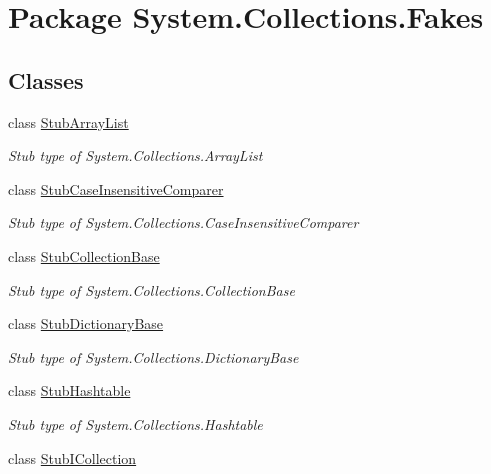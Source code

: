 \hypertarget{namespace_system_1_1_collections_1_1_fakes}{\section{Package System.\-Collections.\-Fakes}
\label{namespace_system_1_1_collections_1_1_fakes}
}
\subsection*{Classes}
\begin{DoxyCompactItemize}
\item 
class \hyperlink{class_system_1_1_collections_1_1_fakes_1_1_stub_array_list}{Stub\-Array\-List}
\begin{DoxyCompactList}\small\item\em Stub type of System.\-Collections.\-Array\-List\end{DoxyCompactList}\item 
class \hyperlink{class_system_1_1_collections_1_1_fakes_1_1_stub_case_insensitive_comparer}{Stub\-Case\-Insensitive\-Comparer}
\begin{DoxyCompactList}\small\item\em Stub type of System.\-Collections.\-Case\-Insensitive\-Comparer\end{DoxyCompactList}\item 
class \hyperlink{class_system_1_1_collections_1_1_fakes_1_1_stub_collection_base}{Stub\-Collection\-Base}
\begin{DoxyCompactList}\small\item\em Stub type of System.\-Collections.\-Collection\-Base\end{DoxyCompactList}\item 
class \hyperlink{class_system_1_1_collections_1_1_fakes_1_1_stub_dictionary_base}{Stub\-Dictionary\-Base}
\begin{DoxyCompactList}\small\item\em Stub type of System.\-Collections.\-Dictionary\-Base\end{DoxyCompactList}\item 
class \hyperlink{class_system_1_1_collections_1_1_fakes_1_1_stub_hashtable}{Stub\-Hashtable}
\begin{DoxyCompactList}\small\item\em Stub type of System.\-Collections.\-Hashtable\end{DoxyCompactList}\item 
class \hyperlink{class_system_1_1_collections_1_1_fakes_1_1_stub_i_collection}{Stub\-I\-Collection}

\end{DoxyCompactItemize}
